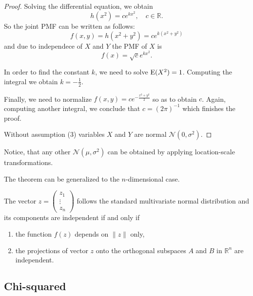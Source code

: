 \begin{proof}
Solving the differential equation, we obtain
\[
h(x^2) = c e^{kx^2}, \quad c \in \mathbb{R}.
\]
So the joint PMF can be written as follows:
\[
f(x,y) = h(x^2 + y^2) = c e^{k(x^2+y^2)}
\]
and due to independece of $X$ and $Y$ the PMF of $X$ is
\[
f(x) = \sqrt{c} e^{kx^2}.
\]


In order to find the constant $k$, we need to solve $\operatorname{E}(X^2) = 1$.
Computing the integral we obtain $k=-\frac{1}{2}$.

Finally, we need to normalize $f(x, y) = c e^{-\frac{x^2 + y^2}{2}}$ so as to
obtain $c$. Again, computing another integral,
we conclude that $c=(2\pi)^{-1}$ which finishes the proof.

Without assumption (3) variables $X$ and $Y$ are normal $\mathcal{N}(0, \sigma^2)$.
\end{proof}

Notice, that any other $\mathcal{N}(\mu, \sigma^2)$ can be obtained by applying
location-scale transformations.

The theorem can be generalized to the $n$-dimensional case.
\begin{theorem}\label{th:mvn}
The vector $z = \begin{pmatrix} z_1 \\ \vdots \\ z_n \end{pmatrix}$
follows the standard multivariate normal distribution and its components
are independent if and only if
\begin{enumerate}
  \item the function $f(z)$ depends on $\lVert z \rVert$ only,
  \item the projections of vector $z$ onto the orthogonal subspaces $A$ and $B$
  in $\mathbb{R}^n$ are independent.
\end{enumerate}
\end{theorem}


\subsection{Chi-squared}

